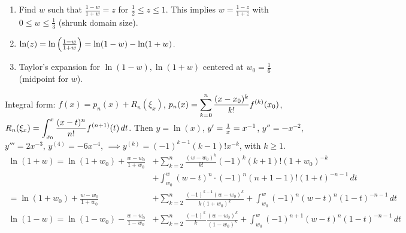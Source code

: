 \documentclass[]{article}
\begin{document}
\begin{enumerate}
	\item Find $w$ such that $\frac{1-w}{1+w}=z$ for $\frac12\leq z\leq 1$.
		This implies $w = \frac{1-z}{1+z}$ with $0\leq w\leq\frac13$ (shrunk domain size).
	\item $\ln(z) = \ln\left(\frac{1-w}{1+w}\right) = \ln(1-w)-\ln(1+w)$.
	\item Taylor's expansion for $\ln(1-w),\ln(1+w)$ centered at $w_0=\frac16$ (midpoint for $w$).
\end{enumerate}
Integral form: 
	$f(x) = p_n(x)+R_n(\xi_x)$, 
	$\displaystyle p_n(x)	 = \sum_{k=0}^n \frac{(x-x_0)^k}{k!}f^{(k)}(x_0)$,
	$\displaystyle R_n(\xi_x) = \int_{x_0}^x\frac{(x-t)^n}{n!}f^{(n+1)}(t)\,dt$.
Then
	$y = \ln(x)$, 
	$y' = \frac1x = x^{-1}$, 
	$y'' = -x^{-2}$, 
	$y''' = 2x^{-3}$,
	$y^{(4)} = -6x^{-4}$,
	$\implies y^{(k)} = (-1)^{k-1}(k-1)! x^{-k}$,
with $k\geq 1$.
\begin{align*}
	\ln(1+w) = \ln(1+w_0) + \frac{w-w_0}{1+w_0} & + \sum_{k=2}^n \frac{(w-w_0)^k}{k!} (-1)^k (k+1)! (1+w_0)^{-k} \\
			  & + \int_{w_0}^w (w-t)^n\cdot(-1)^n(n+1-1)!(1+t)^{-n-1}\,dt \\
			 = \ln(1+w_0) + \frac{w-w_0}{1+w_0} & + \sum_{k=2}^n \frac{(-1)^{k-1}(w-w_0)^k}{k(1+w_0)^k} + \int_{w_0}^w (-1)^n(w-t)^n(1-t)^{-n-1}\,dt \\
	\ln(1-w) = \ln(1-w_0) - \frac{w-w_0}{1-w_0} & + \sum_{k=2}^n \frac{(-1)^k}k \frac{(w-w_0)^k}{(1-w_0)^k} + \int_{w_0}^w (-1)^{n+1}(w-t)^n(1-t)^{-n-1}\,dt
\end{align*}
\end{document}
